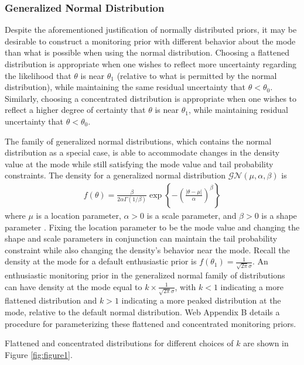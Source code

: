 \documentclass[AMA,STIX1COL,doublespace]{WileyNJD-v2}
\begin{document}
\subsubsection{Generalized Normal Distribution}\label{sec:gen_normal}
Despite the aforementioned justification of normally distributed priors, it may be desirable to construct a monitoring prior with different behavior about the  mode than what is possible when using the normal distribution. 
%
Choosing a flattened distribution is appropriate {when one wishes to reflect more uncertainty regarding the likelihood that 
$\theta$ is near $\theta_1$ (relative to what is permitted by the normal distribution), while maintaining the same residual uncertainty 
that $\theta<\theta_0$}. 
%
Similarly, choosing a concentrated distribution is appropriate {when one wishes to reflect} a higher 
degree of certainty that $\theta$ is near $\theta_1$, while maintaining residual uncertainty that $\theta<\theta_0$. 
%

The family of generalized normal distributions, which contains the normal distribution as a special case, is able to accommodate changes in the density value at the mode while still satisfying the mode value and tail probability constraints. 
%
The density for a generalized normal distribution $\mathcal{GN}(\mu,\alpha,\beta)$ is
\begin{align*}
f(\theta)=\frac{\beta}{2\alpha\Gamma(1/\beta)}\exp\left\{-\left(\frac{|\theta-\mu|}{\alpha}\right)^\beta\right\}
\end{align*} where $\mu$ is a location parameter, $\alpha>0$ is a scale parameter, and $\beta>0$ is a shape parameter \citep{Nadarajah2005}. Fixing the location parameter to be the mode value and changing the shape and scale parameters in conjunction can maintain the tail probability constraint while also changing the density's behavior near the mode. 
%
Recall the density at the mode for a default enthusiastic prior is $f(\theta_1)=\frac{1}{\sqrt{2\pi}\sigma}$. 
%
An enthusiastic monitoring prior in the generalized normal family of distributions can have density at the mode equal to $k\times \frac{1}{\sqrt{2\pi}\sigma}$, with $k<1$ indicating a more flattened distribution and $k>1$ indicating a more peaked distribution at the mode, relative to the default normal distribution. 
%
Web Appendix B details a procedure for parameterizing these flattened and concentrated monitoring priors. 

Flattened and concentrated distributions for different choices of $k$ are shown in Figure \ref{fig:figure1}. 
\end{document}
